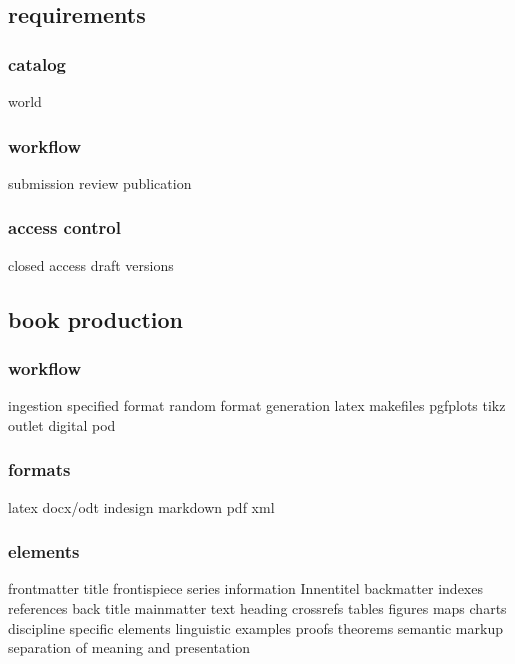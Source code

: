 \documentclass[output=guidelines,guidelines] {langscibook}
\begin{document}
\subsection{requirements}
\subsubsection{catalog}
                    world
\subsubsection{workflow}
                    submission
                    review
                    publication
\subsubsection{access control}
                    closed access
                    draft versions
\subsection{book production}
\subsubsection{workflow}
                    ingestion 
                        specified format
                        random format
                    generation
                        latex
                        makefiles
                        pgfplots
                        tikz
                    outlet
                        digital
                        pod
\subsubsection{formats}
                    latex
                    docx/odt
                    indesign
                    markdown
                    pdf
                    xml
\subsubsection{elements}
                    frontmatter
                        title
                        frontispiece
                        series information
                        Innentitel
                    backmatter
                        indexes
                        references
                        back title
                    mainmatter
                        text
                        heading
                        crossrefs
                        tables
                        figures
                        maps
                        charts
                        discipline specific elements
                            linguistic examples
                            proofs
                            theorems
                    semantic markup
                        separation of meaning and presentation
\end{document}
